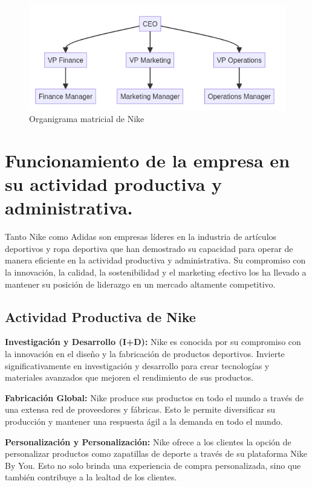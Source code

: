 \documentclass[a4paper,12pt]{article}
\begin{document}
\begin{figure}[ht!]
	\centering

	\includegraphics[width=.75\textwidth]{nike}

	\caption{Organigrama matricial de Nike}
\end{figure}

\section{Funcionamiento de la empresa en su actividad productiva y administrativa.}
Tanto Nike como Adidas son empresas líderes en la industria de artículos deportivos y ropa deportiva que han demostrado su capacidad para operar de manera eficiente en la actividad productiva y administrativa. Su compromiso con la innovación, la calidad, la sostenibilidad y el marketing efectivo los ha llevado a mantener su posición de liderazgo en un mercado altamente competitivo.

\subsection{Actividad Productiva de Nike}

\textbf{Investigación y Desarrollo (I+D):} Nike es conocida por su compromiso con la innovación en el diseño y la fabricación de productos deportivos. Invierte significativamente en investigación y desarrollo para crear tecnologías y materiales avanzados que mejoren el rendimiento de sus productos.

\textbf{Fabricación Global:} Nike produce sus productos en todo el mundo a través de una extensa red de proveedores y fábricas. Esto le permite diversificar su producción y mantener una respuesta ágil a la demanda en todo el mundo.

\textbf{Personalización y Personalización:} Nike ofrece a los clientes la opción de personalizar productos como zapatillas de deporte a través de su plataforma Nike By You. Esto no solo brinda una experiencia de compra personalizada, sino que también contribuye a la lealtad de los clientes.
\end{document}
